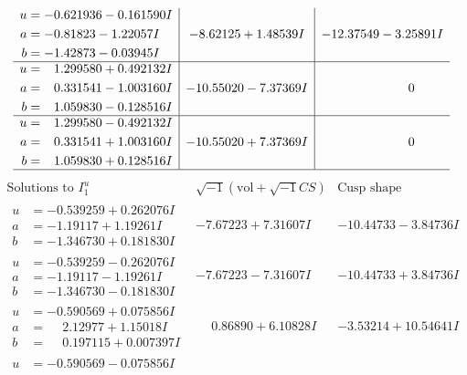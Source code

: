 \documentclass[1p]{elsarticle_modified}
\theoremstyle{definition}
\newcommand{\I}{\sqrt{-1}}
\begin{document}
$$\begin{array}{c|c|c}
\begin{aligned}
u &= -0.621936 - 0.161590 I \\
a &= -0.81823 - 1.22057 I \\
b &= -1.42873 - 0.03945 I\end{aligned}
 & -8.62125 + 1.48539 I & -12.37549 - 3.25891 I \\ \hline\begin{aligned}
u &= \phantom{-}1.299580 + 0.492132 I \\
a &= \phantom{-}0.331541 - 1.003160 I \\
b &= \phantom{-}1.059830 - 0.128516 I\end{aligned}
 & -10.55020 - 7.37369 I & \phantom{-0.000000 } 0 \\ \hline\begin{aligned}
u &= \phantom{-}1.299580 - 0.492132 I \\
a &= \phantom{-}0.331541 + 1.003160 I \\
b &= \phantom{-}1.059830 + 0.128516 I\end{aligned}
 & -10.55020 + 7.37369 I & \phantom{-0.000000 } 0\\
 \hline 
 \end{array}$$\newpage$$\begin{array}{c|c|c}  
\text{Solutions to }I^u_{1}& \I (\text{vol} + \sqrt{-1}CS) & \text{Cusp shape}\\
 \hline 
\begin{aligned}
u &= -0.539259 + 0.262076 I \\
a &= -1.19117 + 1.19261 I \\
b &= -1.346730 + 0.181830 I\end{aligned}
 & -7.67223 + 7.31607 I & -10.44733 - 3.84736 I \\ \hline\begin{aligned}
u &= -0.539259 - 0.262076 I \\
a &= -1.19117 - 1.19261 I \\
b &= -1.346730 - 0.181830 I\end{aligned}
 & -7.67223 - 7.31607 I & -10.44733 + 3.84736 I \\ \hline\begin{aligned}
u &= -0.590569 + 0.075856 I \\
a &= \phantom{-}2.12977 + 1.15018 I \\
b &= \phantom{-}0.197115 + 0.007397 I\end{aligned}
 & \phantom{-}0.86890 + 6.10828 I & -3.53214 + 10.54641 I \\ \hline\begin{aligned}
u &= -0.590569 - 0.075856 I \\

\end{aligned}
\end{array}$$
\end{document}

